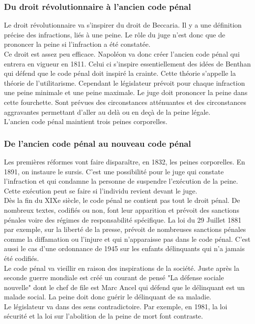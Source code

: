 \documentclass[10pt, a4paper, openany]{book}
\begin{document}
\subsubsection{Du droit révolutionnaire à l'ancien code pénal}

Le droit révolutionnaire va s'inspirer du droit de Beccaria. Il y a une définition précise des infractions, liés à une peine. Le rôle du juge n'est donc que de prononcer la peine si l'infraction a été constatée. \\
Ce droit est assez peu efficace. Napoléon va donc créer l'ancien code pénal qui entrera en vigueur en 1811. Celui ci s'inspire essentiellement des idées de Benthan qui défend que le code pénal doit inspiré la crainte. Cette théorie s'appelle la théorie de l'utilitarisme. Cependant le législateur prévoit pour chaque infraction une peine minimale et une peine maximale. Le juge doit prononcer la peine dans cette fourchette. Sont prévues des circonstances atténuantes et des circonstances aggravantes permettant d'aller au delà ou en deçà de la peine légale. \\
L'ancien code pénal maintient trois peines corporelles. 

\subsubsection{De l'ancien code pénal au nouveau code pénal}

Les premières réformes vont faire disparaître, en 1832, les peines corporelles. En 1891, on instaure le sursis. C'est une possibilité pour le juge qui constate l'infraction et qui condamne la personne de suspendre l'exécution de la peine. Cette exécution peut se faire si l'individu revient devant le juge. \\
Dès la fin du XIXe siècle, le code pénal ne contient pas tout le droit pénal. De nombreux textes, codifiés ou non, font leur apparition et prévoit des sanctions pénales voire des régimes de responsabilité spécifique. La loi du 29 Juillet 1881 par exemple, sur la liberté de la presse, prévoit de nombreuses sanctions pénales comme la diffamation ou l'injure et qui n'apparaisse pas dans le code pénal. C'est aussi le cas d'une ordonnance de 1945 sur les enfants délinquants qui n'a jamais été codifiés. \\
Le code pénal va vieillir en raison des inspirations de la société. Juste après la seconde guerre mondiale est créé un courant de pensé "La défense sociale nouvelle" dont le chef de file est Marc Ancel qui défend que le délinquant est un malade social. La peine doit donc guérir le délinquant de sa maladie. \\
Le législateur va dans des sens contradictoire. Par exemple, en 1981, la loi sécurité et la loi sur l'abolition de la peine de mort font contraste.
\end{document}
